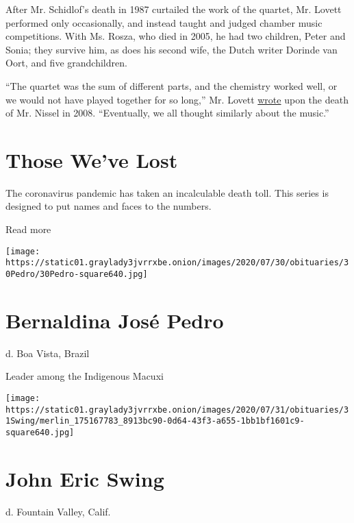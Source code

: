 After Mr. Schidlof's death in 1987 curtailed the work of the quartet,
Mr. Lovett performed only occasionally, and instead taught and judged
chamber music competitions. With Ms. Rosza, who died in 2005, he had two
children, Peter and Sonia; they survive him, as does his second wife,
the Dutch writer Dorinde van Oort, and five grandchildren.

``The quartet was the sum of different parts, and the chemistry worked
well, or we would not have played together for so long,'' Mr. Lovett
\href{https://www.theguardian.com/music/2008/may/23/classicalmusicandopera}{wrote}
upon the death of Mr. Nissel in 2008. ``Eventually, we all thought
similarly about the music.''

\href{https://www.nytimes3xbfgragh.onion/interactive/2020/obituaries/people-died-coronavirus-obituaries.html?action=click\&pgtype=Article\&state=default\&region=BELOW_MAIN_CONTENT\&context=covid_obits_promo}{}

\hypertarget{those-weve-lost}{%
\section{Those We've Lost}\label{those-weve-lost}}

The coronavirus pandemic has taken an incalculable death toll. This
series is designed to put names and faces to the numbers.

Read more

\texttt{[image: https://static01.graylady3jvrrxbe.onion/images/2020/07/30/obituaries/30Pedro/30Pedro-square640.jpg]}

\hypertarget{bernaldina-josuxe9-pedro}{%
\section{Bernaldina José Pedro}\label{bernaldina-josuxe9-pedro}}

d. Boa Vista, Brazil

Leader among the Indigenous Macuxi

\texttt{[image: https://static01.graylady3jvrrxbe.onion/images/2020/07/31/obituaries/31Swing/merlin\_175167783\_8913bc90-0d64-43f3-a655-1bb1bf1601c9-square640.jpg]}

\hypertarget{john-eric-swing}{%
\section{John Eric Swing}\label{john-eric-swing}}

d. Fountain Valley, Calif.


